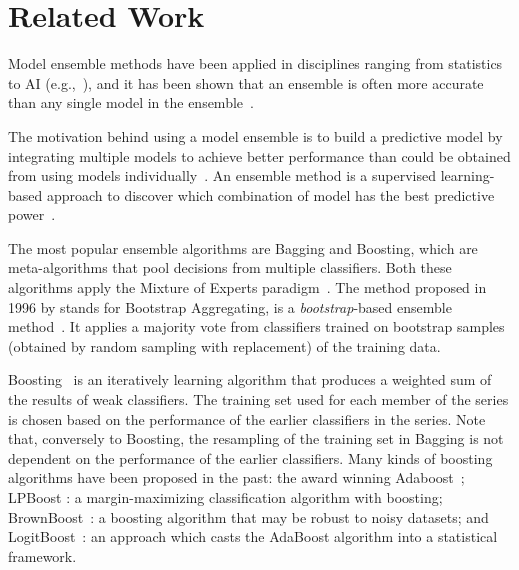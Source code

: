 \section{Related Work}
\label{sec-RelWork}
Model ensemble methods have been applied in disciplines ranging from statistics
to AI (e.g.,~\citep{breiman1996stacked,clemen1989combining,wolpert1992stacked}),
and it has been shown that an ensemble is often more accurate than any single
model in the ensemble~\citep{maclin2011popular}.

The motivation behind using a model ensemble is to build a predictive
model by integrating multiple models to achieve better performance
than could be obtained from using models
individually~\citep{maclin2011popular,rokach2010ensemble}. An ensemble
method is a supervised learning-based approach to discover which
combination of model has the best predictive
power~\citep{kuncheva2003measures}.

The most popular ensemble algorithms are Bagging and Boosting, which are meta-algorithms
that pool decisions from multiple classifiers. Both these algorithms apply the Mixture
of Experts paradigm~\citep{brown2010ensemble}.
%
The method proposed in 1996 by \cite{breiman1996stacked} stands for
Bootstrap Aggregating, is a \textit{bootstrap}-based ensemble
method~\citep{efron1994introduction}.  It applies a majority vote from
classifiers trained on bootstrap samples (obtained by random sampling
with replacement) of the training data.

Boosting~\citep{freund1996experiments,schapire1990strength} is an
iteratively learning algorithm that produces a weighted sum of the
results of weak classifiers. The training set used for each member of
the series is chosen based on the performance of the earlier
classifiers in the series. Note that, conversely to Boosting, the
resampling of the training set in Bagging is not dependent on the
performance of the earlier classifiers.  Many kinds of boosting
algorithms have been proposed in the past: the award winning
Adaboost~\citep{freund1996experiments}; LPBoost
\citep{demiriz2002linear}: a margin-maximizing classification
algorithm with boosting; BrownBoost~\cite{freund2001adaptive}: a
boosting algorithm that may be robust to noisy datasets; and
LogitBoost~\citep{friedman2000additive}: an approach which casts the
AdaBoost algorithm into a statistical framework.

